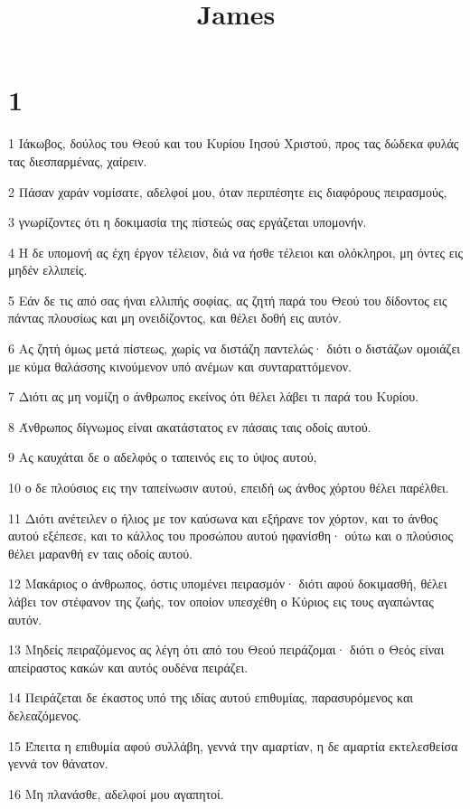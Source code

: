 

\title{James}


\chapter{1}

\par 1 Ιάκωβος, δούλος του Θεού και του Κυρίου Ιησού Χριστού, προς τας δώδεκα φυλάς τας διεσπαρμένας, χαίρειν.
\par 2 Πάσαν χαράν νομίσατε, αδελφοί μου, όταν περιπέσητε εις διαφόρους πειρασμούς,
\par 3 γνωρίζοντες ότι η δοκιμασία της πίστεώς σας εργάζεται υπομονήν.
\par 4 Η δε υπομονή ας έχη έργον τέλειον, διά να ήσθε τέλειοι και ολόκληροι, μη όντες εις μηδέν ελλιπείς.
\par 5 Εάν δε τις από σας ήναι ελλιπής σοφίας, ας ζητή παρά του Θεού του δίδοντος εις πάντας πλουσίως και μη ονειδίζοντος, και θέλει δοθή εις αυτόν.
\par 6 Ας ζητή όμως μετά πίστεως, χωρίς να διστάζη παντελώς· διότι ο διστάζων ομοιάζει με κύμα θαλάσσης κινούμενον υπό ανέμων και συνταραττόμενον.
\par 7 Διότι ας μη νομίζη ο άνθρωπος εκείνος ότι θέλει λάβει τι παρά του Κυρίου.
\par 8 Άνθρωπος δίγνωμος είναι ακατάστατος εν πάσαις ταις οδοίς αυτού.
\par 9 Ας καυχάται δε ο αδελφός ο ταπεινός εις το ύψος αυτού,
\par 10 ο δε πλούσιος εις την ταπείνωσιν αυτού, επειδή ως άνθος χόρτου θέλει παρέλθει.
\par 11 Διότι ανέτειλεν ο ήλιος με τον καύσωνα και εξήρανε τον χόρτον, και το άνθος αυτού εξέπεσε, και το κάλλος του προσώπου αυτού ηφανίσθη· ούτω και ο πλούσιος θέλει μαρανθή εν ταις οδοίς αυτού.
\par 12 Μακάριος ο άνθρωπος, όστις υπομένει πειρασμόν· διότι αφού δοκιμασθή, θέλει λάβει τον στέφανον της ζωής, τον οποίον υπεσχέθη ο Κύριος εις τους αγαπώντας αυτόν.
\par 13 Μηδείς πειραζόμενος ας λέγη ότι από του Θεού πειράζομαι· διότι ο Θεός είναι απείραστος κακών και αυτός ουδένα πειράζει.
\par 14 Πειράζεται δε έκαστος υπό της ιδίας αυτού επιθυμίας, παρασυρόμενος και δελεαζόμενος.
\par 15 Έπειτα η επιθυμία αφού συλλάβη, γεννά την αμαρτίαν, η δε αμαρτία εκτελεσθείσα γεννά τον θάνατον.
\par 16 Μη πλανάσθε, αδελφοί μου αγαπητοί.
